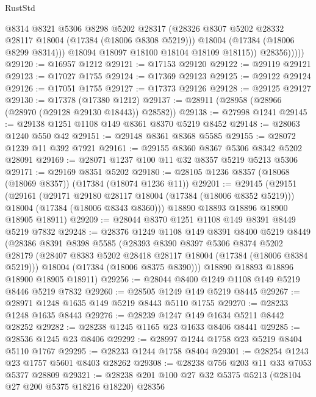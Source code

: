 \begin{lexlean}{RustStd}
\begin{coremodule}
                    @8314
                    @8321
                    @5306
                    @8298
                    @5202
                    @28317
                    (@28326 @8307 @5202 @28332 @28117 @18004 (@17384 (@18006 @8308 @5219)))
                    @18004
                    (@17384 (@18006 @8299 @8314)))
                  @18094
                  @18097
                  @18100
                  @18104
                  @18109
                  @18115))
              @28356)))))
@29120 := @16957 @1212
@29121 := @17153 @29120
@29122 := @29119 @29121
@29123 := @17027 @1755
@29124 := @17369 @29123
@29125 := @29122 @29124
@29126 := @17051 @1755
@29127 := @17373 @29126
@29128 := @29125 @29127
@29130 := @17378 (@17380 @1212)
@29137 := @28911 (@28958 (@28966 (@28970 (@29128 @29130 @18443)) @28582))
@29138 := @27998 @1241
@29145 := @29138 @1251 @1108 @149 @8361 @8370 @5219 @8452
@29148 := @28063 @1240 @550 @42
@29151 := @29148 @8361 @8368 @5585
@29155 := @28072 @1239 @11 @392 @7921
@29161 := @29155 @8360 @8367 @5306 @8342 @5202 @28091
@29169 := @28071 @1237 @100 @11 @32 @8357 @5219 @5213 @5306
@29171 := @29169 @8351 @5202
@29180 := @28105 @1236 @8357 (@18068 (@18069 @8357)) (@17384 (@18074 @1236 @11))
@29201 := @29145
    (@29151
      (@29161
        (@29171 @29180 @28117 @18004 (@17384 (@18006 @8352 @5219)))
        @18004
        (@17384 (@18006 @8343 @8360)))
      @18890
      @18893
      @18896
      @18900
      @18905
      @18911)
@29209 := @28044 @8370 @1251 @1108 @149 @8391 @8449 @5219 @7832
@29248 := @28376
    @1249
    @1108
    @149
    @8391
    @8400
    @5219
    @8449
    (@28386
      @8391
      @8398
      @5585
      (@28393
        @8390
        @8397
        @5306
        @8374
        @5202
        @28179
        (@28407 @8383 @5202 @28418 @28117 @18004 (@17384 (@18006 @8384 @5219)))
        @18004
        (@17384 (@18006 @8375 @8390)))
      @18890
      @18893
      @18896
      @18900
      @18905
      @18911)
@29256 := @28044 @8400 @1249 @1108 @149 @5219 @8446 @5219 @7832
@29260 := @28505 @1249 @149 @5219 @8445
@29267 := @28971 @1248 @1635 @149 @5219 @8443 @5110 @1755
@29270 := @28233 @1248 @1635 @8443
@29276 := @28239 @1247 @149 @1634 @5211 @8442 @28252
@29282 := @28238 @1245 @1165 @23 @1633 @8406 @8441
@29285 := @28536 @1245 @23 @8406
@29292 := @28997 @1244 @1758 @23 @5219 @8404 @5110 @1767
@29295 := @28233 @1244 @1758 @8404
@29301 := @28254 @1243 @23 @1757 @5601 @8403 @28262
@29308 := @28238 @756 @203 @11 @33 @7053 @5377 @28809
@29321 := @28238 @201 @100 @27 @32 @5375 @5213 (@28104 @27 @200 @5375 @18216 @18220) @28356

\end{coremodule}
\end{lexlean}
